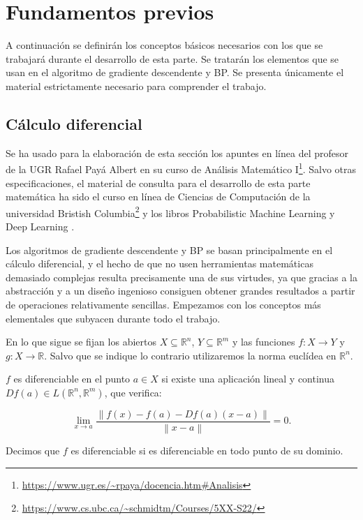 \section{Fundamentos previos}
A continuación se definirán los conceptos básicos necesarios con los que se trabajará durante el desarrollo de esta parte. Se tratarán los elementos que se usan en el algoritmo de gradiente descendente y BP. Se presenta únicamente el material estrictamente necesario para comprender el trabajo. 


\subsection{Cálculo diferencial}
Se ha usado para la elaboración de esta sección los apuntes en línea del profesor de la UGR Rafael Payá Albert en su curso de Análisis Matemático I\footnote{\url{https://www.ugr.es/~rpaya/docencia.htm\#Analisis}}.  Salvo otras especificaciones, el material de consulta para el desarrollo de esta parte matemática ha sido el curso en línea de Ciencias de Computación de la universidad Bristish Columbia\footnote{\url{https://www.cs.ubc.ca/~schmidtm/Courses/5XX-S22/}} y los libros Probabilistic Machine Learning \cite{pml1Book} y Deep Learning \cite{GoodFellowBook}.

Los algoritmos de gradiente descendente y BP se basan principalmente en el cálculo diferencial, y el hecho de que no usen herramientas matemáticas demasiado complejas resulta precisamente una de sus virtudes, ya que gracias a la abstracción y a un diseño ingenioso consiguen obtener grandes resultados a partir de operaciones relativamente sencillas. Empezamos con los conceptos más elementales que subyacen durante todo el trabajo.

En lo que sigue se fijan los abiertos $X \subseteq \mathbb{R}^n$, $Y \subseteq \mathbb{R}^m$ y las funciones $f: X \rightarrow Y$ y $g: X \rightarrow \mathbb{R}$. Salvo que se indique lo contrario utilizaremos la norma euclídea en $\mathbb{R}^n$.


\begin{definicion}
    $f$ es diferenciable en el punto $a \in X$ si existe una aplicación lineal y continua $Df(a) \in L(\mathbb{R}^n,\mathbb{R}^m)$,  que verifica:

    $$ \displaystyle \lim_{x \to a} \frac{\left\| f(x)-f(a)-Df(a)(x-a)\right\|}{\left\| x-a\right\|}=0.$$
    
    Decimos que $f$ es diferenciable si es diferenciable en todo punto de su dominio.
\end{definicion}




